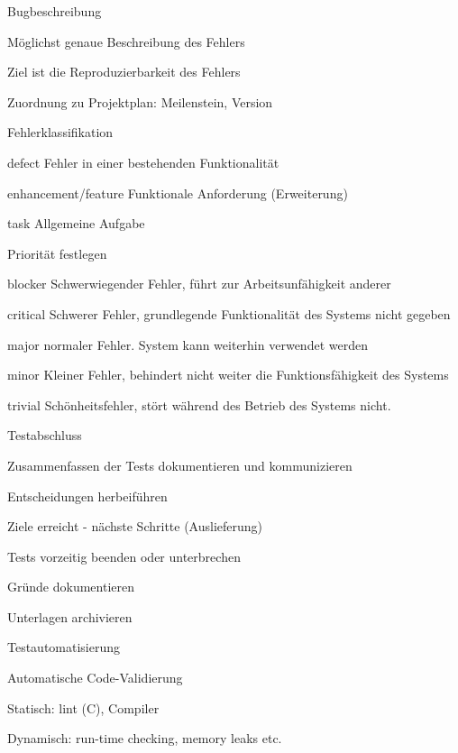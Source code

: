 \documentclass[a4paper]{article}
\begin{document}
\begin{multicols}{3}
  Bugbeschreibung
  \begin{itemize*}
    \item Möglichst genaue Beschreibung des Fehlers
    \item Ziel ist die Reproduzierbarkeit des Fehlers
    \item Zuordnung zu Projektplan: Meilenstein, Version
    \item Fehlerklassifikation
    \begin{description*}
      \item[defect] Fehler in einer bestehenden Funktionalität
      \item[enhancement/feature] Funktionale Anforderung (Erweiterung)
      \item[task] Allgemeine Aufgabe
    \end{description*}
    \item Priorität festlegen
    \begin{description*}
      \item[blocker] Schwerwiegender Fehler, führt zur Arbeitsunfähigkeit anderer
      \item[critical] Schwerer Fehler, grundlegende Funktionalität des Systems nicht gegeben
      \item[major] normaler Fehler. System kann weiterhin verwendet werden
      \item[minor] Kleiner Fehler, behindert nicht weiter die Funktionsfähigkeit des Systems
      \item[trivial] Schönheitsfehler, stört während des Betrieb des Systems nicht.
    \end{description*}
  \end{itemize*}

  Testabschluss
  \begin{itemize*}
    \item Zusammenfassen der Tests dokumentieren und kommunizieren
    \item Entscheidungen herbeiführen
    \begin{itemize*}
      \item Ziele erreicht - nächste Schritte (Auslieferung)
      \item Tests vorzeitig beenden oder unterbrechen
      \item Gründe dokumentieren
    \end{itemize*}
    \item Unterlagen archivieren
  \end{itemize*}

  Testautomatisierung
  \begin{itemize*}
    \item Automatische Code-Validierung
    \item Statisch: lint (C), Compiler
    \item Dynamisch: run-time checking, memory leaks etc.
  \end{itemize*}


\end{multicols}
\end{document}
